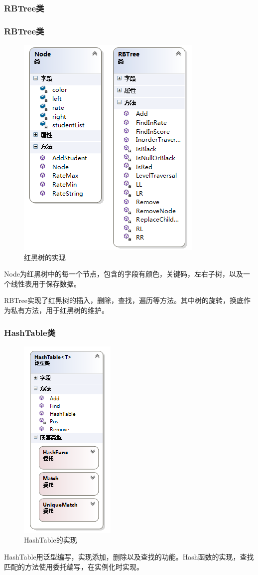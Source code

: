 \documentclass{beamer}
\begin{document}
\begin{frame}
\frametitle{RBTree类}
\subsubsection{RBTree类}
\begin{figure}[H]
\centering
\includegraphics[scale = 0.4]{4.png}
\caption{红黑树的实现} 
\end{figure}
Node为红黑树中的每一个节点，包含的字段有颜色，关键码，左右子树，以及一个线性表用于保存数据。\par
RBTree实现了红黑树的插入，删除，查找，遍历等方法。其中树的旋转，换底作为私有方法，用于红黑树的维护。
\end{frame}

\begin{frame}
\subsubsection{HashTable类}
\begin{figure}[H]
\centering
\includegraphics[scale = 0.4]{5.png}
\caption{HashTable的实现} 
\end{figure}
HashTable用泛型编写，实现添加，删除以及查找的功能。Hash函数的实现，查找匹配的方法使用委托编写，在实例化时实现。
\end{frame}
\end{document}
